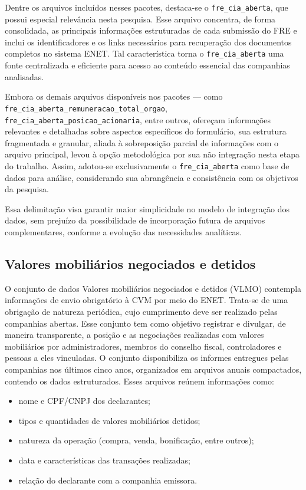 Dentre os arquivos incluídos nesses pacotes, destaca-se o \texttt{fre\_cia\_aberta}, que possui especial relevância nesta pesquisa. Esse arquivo concentra, de forma consolidada, as principais informações estruturadas de cada submissão do FRE e inclui os identificadores e os links necessários para recuperação dos documentos completos no sistema ENET. Tal característica torna o \texttt{fre\_cia\_aberta} uma fonte centralizada e eficiente para acesso ao conteúdo essencial das companhias analisadas.

Embora os demais arquivos disponíveis nos pacotes — como \texttt{fre\_cia\_aberta\_remuneracao\_total\_orgao}, \texttt{fre\_cia\_aberta\_posicao\_acionaria}, entre outros, ofereçam informações relevantes e detalhadas sobre aspectos específicos do formulário, sua estrutura fragmentada e granular, aliada à sobreposição parcial de informações com o arquivo principal, levou à opção metodológica por sua não integração nesta etapa do trabalho. Assim, adotou-se exclusivamente o \texttt{fre\_cia\_aberta} como base de dados para análise, considerando sua abrangência e consistência com os objetivos da pesquisa.

Essa delimitação visa garantir maior simplicidade no modelo de integração dos dados, sem prejuízo da possibilidade de incorporação futura de arquivos complementares, conforme a evolução das necessidades analíticas.


\subsection{Valores mobiliários negociados e detidos}
O conjunto de dados Valores mobiliários negociados e detidos (VLMO) contempla informações de envio obrigatório à CVM por meio do ENET. Trata-se de uma obrigação de natureza periódica, cujo cumprimento deve ser realizado pelas companhias abertas. Esse conjunto tem como objetivo registrar e divulgar, de maneira transparente, a posição e as negociações realizadas com valores mobiliários por administradores, membros do conselho fiscal, controladores e pessoas a eles vinculadas. O conjunto disponibiliza os informes entregues pelas companhias nos últimos cinco anos, organizados em arquivos anuais compactados, contendo os dados estruturados. Esses arquivos reúnem informações como:

\begin{itemize}
	\item nome e CPF/CNPJ dos declarantes;
	\item tipos e quantidades de valores mobiliários detidos;
	\item natureza da operação (compra, venda, bonificação, entre outros);
	\item data e características das transações realizadas;
	\item relação do declarante com a companhia emissora.
\end{itemize}

